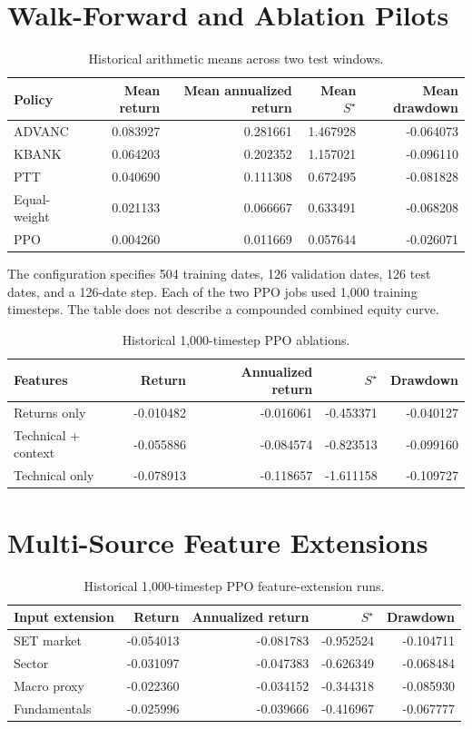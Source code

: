 \documentclass[12pt,a4paper,oneside]{book}
\theoremstyle{plain}
\numberwithin{equation}{chapter} \DeclareMathOperator{\Var}{Var}
\begin{document}
\section{Walk-Forward and Ablation Pilots}
\begin{table}[H]
\centering\small
\caption{Historical arithmetic means across two test windows.}
\label{tab:walk}
\begin{tabular}{@{}lrrrr@{}}
\toprule
Policy & Mean return & Mean annualized return & Mean $S^\star$ & Mean drawdown \\
\midrule
ADVANC & 0.083927 & 0.281661 & 1.467928 & -0.064073 \\
KBANK & 0.064203 & 0.202352 & 1.157021 & -0.096110 \\
PTT & 0.040690 & 0.111308 & 0.672495 & -0.081828 \\
Equal-weight & 0.021133 & 0.066667 & 0.633491 & -0.068208 \\
PPO & 0.004260 & 0.011669 & 0.057644 & -0.026071 \\
\bottomrule
\end{tabular}
\end{table}
The configuration specifies 504 training dates, 126 validation dates, 126 test dates, and a 126-date step. Each of the two PPO jobs used 1,000 training timesteps. The table does not describe a compounded combined equity curve.
\begin{table}[H]
\centering\small
\caption{Historical 1,000-timestep PPO ablations.}
\label{tab:ablation}
\begin{tabular}{@{}lrrrr@{}}
\toprule
Features & Return & Annualized return & $S^\star$ & Drawdown \\
\midrule
Returns only & -0.010482 & -0.016061 & -0.453371 & -0.040127 \\
Technical + context & -0.055886 & -0.084574 & -0.823513 & -0.099160 \\
Technical only & -0.078913 & -0.118657 & -1.611158 & -0.109727 \\
\bottomrule
\end{tabular}
\end{table}
\section{Multi-Source Feature Extensions}
\begin{table}[H]
\centering\small
\caption{Historical 1,000-timestep PPO feature-extension runs.}
\label{tab:features}
\begin{tabular}{@{}lrrrr@{}}
\toprule
Input extension & Return & Annualized return & $S^\star$ & Drawdown \\
\midrule
SET market & -0.054013 & -0.081783 & -0.952524 & -0.104711 \\
Sector & -0.031097 & -0.047383 & -0.626349 & -0.068484 \\
Macro proxy & -0.022360 & -0.034152 & -0.344318 & -0.085930 \\
Fundamentals & -0.025996 & -0.039666 & -0.416967 & -0.067777 \\
\bottomrule
\end{tabular}
\end{table}
\end{document}

